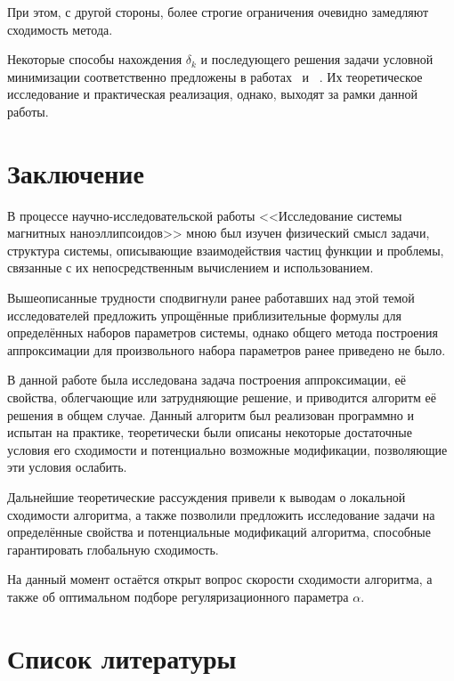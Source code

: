 \documentclass[a4paper,14pt]{extarticle}
\begin{document}
    При этом, с другой стороны, более строгие ограничения очевидно замедляют
    сходимость метода.

    Некоторые способы нахождения $\delta_k$ и последующего решения задачи
    условной минимизации соответственно предложены в
    работах~\cite{bib:Jonca:1988} и
    ~\cite[стр. 134]{bib:Dennis:1983}.
    Их теоретическое исследование и практическая реализация, однако, выходят
    за рамки данной работы.

    \newpage

    \section*{Заключение}

    В процессе научно-исследовательской работы
    <<Исследование системы магнитных наноэллипсоидов>>
    мною был изучен физический смысл задачи, структура системы,
    описывающие взаимодействия частиц функции и проблемы, связанные с их
    непосредственным вычислением и использованием.

    Вышеописанные трудности сподвигнули ранее работавших над этой темой
    исследователей предложить упрощённые приблизительные формулы для
    определённых наборов параметров системы, однако общего метода
    построения аппроксимации для произвольного набора параметров ранее
    приведено не было.

    В данной работе была исследована задача построения аппроксимации,
    её свойства, облегчающие или затрудняющие решение, и приводится алгоритм
    её решения в общем случае.
    Данный алгоритм был реализован программно и испытан на практике,
    теоретически были описаны некоторые достаточные условия его сходимости
    и потенциально возможные модификации, позволяющие эти условия ослабить.

    Дальнейшие теоретические рассуждения привели к выводам
    о локальной сходимости алгоритма, а также позволили предложить
    исследование задачи на определённые свойства и
    потенциальные модификаций алгоритма, способные гарантировать
    глобальную сходимость.

    На данный момент остаётся открыт вопрос скорости сходимости алгоритма,
    а также об оптимальном подборе регуляризационного параметра $\alpha$.

    \newpage

    \section*{Список литературы}
\end{document}
